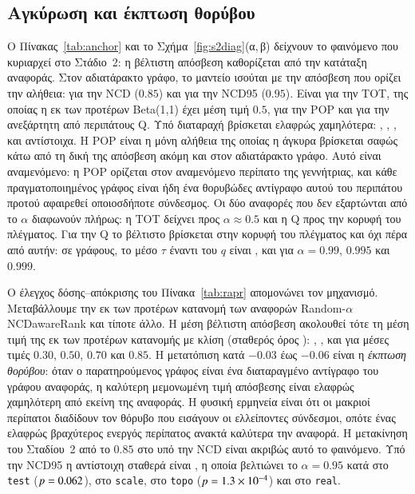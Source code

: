 \documentclass[11pt,a4paper]{article}
\theoremstyle{definition}
\theoremstyle{remark}
\begin{document}


\subsection{Αγκύρωση και έκπτωση θορύβου}
\label{sec:anchor}
Ο Πίνακας~\ref{tab:anchor} και το Σχήμα~\ref{fig:s2diag}(α,\,β) δείχνουν το φαινόμενο που κυριαρχεί
στο Στάδιο~2: η βέλτιστη απόσβεση καθορίζεται από την κατάταξη αναφοράς. Στον αδιατάρακτο γράφο, το
μαντείο ισούται με την απόσβεση που ορίζει την αλήθεια: \AnchorNcd{} για την NCD ($0.85$) και
\AnchorNcdnf{} για την NCD95 ($0.95$). Είναι \AnchorTot{} για την TOT, της οποίας η εκ των προτέρων
Beta(1,1) έχει μέση τιμή $0.5$, \AnchorPop{} για την POP και \AnchorQ{} για την ανεξάρτητη από
περιπάτους Q. Υπό διαταραχή βρίσκεται ελαφρώς χαμηλότερα: \MeanNcd, \MeanNcdnf, \MeanTot, \MeanPop{} και
\MeanQ{} αντίστοιχα. Η POP είναι η μόνη αλήθεια της οποίας η άγκυρα βρίσκεται σαφώς κάτω από τη δική
της απόσβεση ακόμη και στον αδιατάρακτο γράφο. Αυτό είναι αναμενόμενο: η POP ορίζεται στον αναμενόμενο
περίπατο της γεννήτριας, και κάθε πραγματοποιημένος γράφος είναι ήδη ένα θορυβώδες αντίγραφο αυτού του
περιπάτου προτού αφαιρεθεί οποιοσδήποτε σύνδεσμος. Οι δύο αναφορές που δεν εξαρτώνται από το $\alpha$
διαφωνούν πλήρως: η TOT δείχνει προς $\alpha\approx0.5$ και η Q προς την κορυφή του πλέγματος. Για την Q
το βέλτιστο βρίσκεται στην κορυφή του πλέγματος και όχι πέρα από αυτήν: σε \QupGraphs{} γράφους, το μέσο
$\tau$ έναντι του $q$ είναι \QupNine, \QupNineFive{} και \QupNineNine{} για $\alpha=0.99$, $0.995$ και
$0.999$.



Ο έλεγχος δόσης--απόκρισης του Πίνακα~\ref{tab:rapr} απομονώνει τον μηχανισμό. Μεταβάλλουμε την εκ των
προτέρων κατανομή των αναφορών Random-$\alpha$ NCDawareRank και τίποτε άλλο. Η μέση βέλτιστη απόσβεση
ακολουθεί τότε τη μέση τιμή της εκ των προτέρων κατανομής με κλίση \RaprSlope{} (σταθερός όρος
\RaprIcpt): \RaprLo, \RaprMid, \RaprHi{} και \RaprTop{} για μέσες τιμές $0.30$, $0.50$, $0.70$ και
$0.85$. Η μετατόπιση κατά $-0.03$ έως $-0.06$ είναι η \emph{έκπτωση θορύβου}: όταν ο παρατηρούμενος
γράφος είναι ένα διαταραγμένο αντίγραφο του γράφου αναφοράς, η καλύτερη μεμονωμένη τιμή απόσβεσης είναι
ελαφρώς χαμηλότερη από εκείνη της αναφοράς. Η φυσική ερμηνεία είναι ότι οι μακριοί περίπατοι διαδίδουν
τον θόρυβο που εισάγουν οι ελλείποντες σύνδεσμοι, οπότε ένας ελαφρώς βραχύτερος ενεργός περίπατος ανακτά
καλύτερα την αναφορά.
Η μετακίνηση του Σταδίου~2 από το $0.85$ στο \STwoConstAlpha{} υπό την NCD είναι ακριβώς αυτό το
φαινόμενο. Υπό την NCD95 η αντίστοιχη σταθερά είναι \NfConstAlpha, η οποία βελτιώνει το $\alpha=0.95$
κατά \NfTestD{} στο \texttt{test} ($p=0.062$), \NfScaleD{} στο \texttt{scale}, \NfTopoD{} στο
\texttt{topo} ($p=1.3\times10^{-4}$) και \NfRealD{} στο \texttt{real}.
\end{document}
